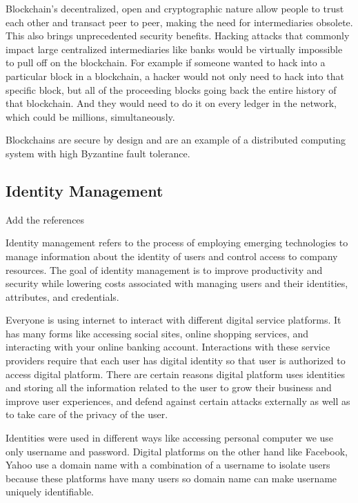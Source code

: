 Blockchain’s decentralized, open and cryptographic nature allow people to trust each other and transact peer to peer, making the need for intermediaries obsolete. This also brings unprecedented security benefits. Hacking attacks that commonly impact large centralized intermediaries like banks would be virtually impossible to pull off on the blockchain. For example if someone wanted to hack into a particular block in a blockchain, a hacker would not only need to hack into that specific block, but all of the proceeding blocks going back the entire history of that blockchain. And they would need to do it on every ledger in the network, which could be millions, simultaneously.

Blockchains are secure by design and are an example of a distributed computing system with high Byzantine fault tolerance.


\subsection{Identity Management}
\begin{notation}
  Add the references
\end{notation}

Identity management refers to the process of employing emerging technologies to manage information about the identity of users and control access to company resources\citep{IdentityManagement}. The goal of identity management is to improve productivity and security while lowering costs associated with managing users and their identities, attributes, and credentials.

Everyone is using internet to interact with different digital service platforms.
It has many forms like accessing social sites, online shopping services, and interacting with your online banking account. Interactions with these service providers require that each user has digital identity so that user is authorized to access digital platform. There are certain reasons digital platform uses identities and storing all the information related to the user to grow their business and improve user experiences, and defend against certain attacks externally as well as to take care of the privacy of the user.

Identities were used in different ways like accessing personal computer we use only username and password. Digital platforms on the other hand like Facebook, Yahoo use a domain name with a combination of a username to isolate users because these platforms have many users so domain name can make username uniquely identifiable\citep{gondor2016distributed}.

